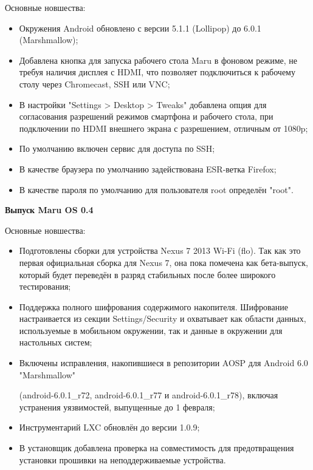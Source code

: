 \documentclass[a4paper, 14pt]{article}
\begin{document}
\par Основные новшества:

\begin{itemize}
    \item Окружения Android обновлено с версии 5.1.1 (Lollipop) до 6.0.1 (Marshmallow);
    \item Добавлена кнопка для запуска рабочего стола Maru в фоновом режиме, не требуя наличия дисплея с HDMI, что позволяет подключиться к рабочему столу через Chromecast, SSH или VNC;
    \item В настройки "Settings > Desktop > Tweaks" добавлена опция для согласования разрешений режимов смартфона и рабочего стола, при подключении по HDMI внешнего экрана с разрешением, отличным от 1080p;
    \item По умолчанию включен сервис для доступа по SSH;
    \item В качестве браузера по умолчанию задействована ESR-ветка Firefox;
    \item В качестве пароля по умолчанию для пользователя root определён "root".
\end{itemize}

\par \textbf{Выпуск Maru OS 0.4}

\par Основные новшества:

\begin{itemize}
    \item Подготовлены сборки для устройства Nexus 7 2013 Wi-Fi (flo). Так как это первая официальная сборка для Nexus 7, она пока помечена как бета-выпуск, который будет переведён в разряд стабильных после более широкого тестирования;
    \item Поддержка полного шифрования содержимого накопителя. Шифрование настраивается из секции Settings/Security и охватывает как области данных, используемые в мобильном окружении, так и данные в окружении для настольных систем;
    \item Включены исправления, накопившиеся в репозитории AOSP для Android 6.0 "Marshmallow" 
    
    (android-6.0.1\_r72, android-6.0.1\_r77 и android-6.0.1\_r78), включая устранения уязвимостей, выпущенные до 1 февраля;
    \item Инструментарий LXC обновлён до версии 1.0.9;
    \item В установщик добавлена проверка на совместимость для предотвращения установки прошивки на неподдерживаемые устройства.
\end{itemize}
\end{document}
